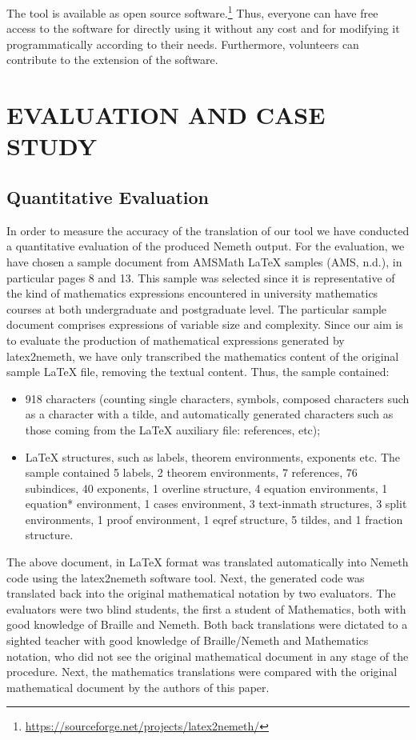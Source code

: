 \documentclass[11.5pt]{sig-alternate} %
\begin{document}
\begin{large}
The tool is available as open source software.\footnote{\url{https://sourceforge.net/projects/latex2nemeth/}}  Thus, everyone can have free access to the software for directly using it without any cost and for modifying it programmatically according to their needs. Furthermore, volunteers can contribute to the extension of the software.

\section*{EVALUATION AND CASE STUDY}

\subsection*{Quantitative Evaluation}

In order to measure the accuracy of the translation of our tool we have conducted a quantitative evaluation of the produced Nemeth output. For the evaluation, we have chosen a sample document from AMSMath LaTeX samples (AMS, n.d.), in particular pages 8 and 13. This sample was selected since it is representative of the kind of mathematics expressions encountered in university mathematics courses at both undergraduate and postgraduate level. The particular sample document comprises expressions of variable size and complexity. Since our aim is to evaluate the production of mathematical expressions generated by latex2nemeth, we have only transcribed the mathematics content of the original sample LaTeX file, removing the textual content. Thus, the sample contained:

\begin{itemize}
    \item  918 characters (counting single characters, symbols, composed characters such as a character with a tilde, and automatically generated characters such as those coming from the LaTeX auxiliary file: references, etc);
    \item  LaTeX structures, such as labels, theorem environments, exponents etc. The sample contained 5 labels, 2 theorem environments, 7 references, 76 subindices, 40 exponents, 1 overline structure, 4 equation environments, 1 equation* environment, 1 cases environment, 3 text-inmath structures, 3 split environments, 1 proof environment, 1 eqref structure, 5 tildes, and 1 fraction structure.
\end{itemize}

The above document, in LaTeX format was translated automatically into Nemeth code using the latex2nemeth software tool. Next, the generated code was translated back into the original mathematical notation by two evaluators. The evaluators were two blind students, the first a student of Mathematics, both with good knowledge of Braille and Nemeth. Both back translations were dictated to a sighted teacher with good knowledge of Braille/Nemeth and Mathematics notation, who did not see the original mathematical document in any stage of the procedure. Next, the mathematics translations were compared with the original mathematical document by the authors of this paper. 


\end{large}
\end{document}
